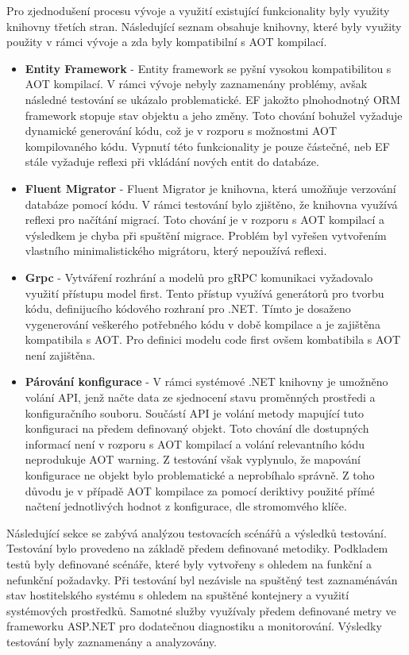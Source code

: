 
Pro zjednodušení procesu vývoje a využití existující funkcionality byly využity knihovny třetích stran. Následující seznam obsahuje knihovny, které byly využity použity v rámci vývoje a zda byly kompatibilní s AOT kompilací.

\begin{itemize}
  \item \textbf{Entity Framework} - Entity framework se pyšní vysokou kompatibilitou s AOT kompilací. V rámci vývoje nebyly zaznamenány problémy, avšak následné testování se ukázalo problematické. EF jakožto plnohodnotný ORM framework stopuje stav objektu a jeho změny. Toto chování bohužel vyžaduje dynamické generování kódu, což je v rozporu s možnostmi AOT kompilovaného kódu. Vypnutí této funkcionality je pouze částečné, neb EF stále vyžaduje reflexi při vkládání nových entit do databáze.
  \item \textbf{Fluent Migrator} - Fluent Migrator je knihovna, která umožňuje verzování databáze pomocí kódu. V rámci testování bylo zjištěno, že knihovna využívá reflexi pro načítání migrací. Toto chování je v rozporu s AOT kompilací a výsledkem je chyba při spuštění migrace. Problém byl vyřešen vytvořením vlastního minimalistického migrátoru, který nepoužívá reflexi.
  \item \textbf{Grpc} - Vytváření rozhrání a modelů pro gRPC komunikaci vyžadovalo využití přístupu model first. Tento přístup využívá generátorů pro tvorbu kódu, definijucího kódového rozhraní pro .NET. Tímto je dosaženo vygenerování veškerého potřebného kódu v době kompilace a je zajištěna kompatibila s AOT. Pro definici modelu code first ovšem kombatibila s AOT není zajištěna.
  \item \textbf{Párování konfigurace} - V rámci systémové .NET knihovny je umožněno volání API, jenž načte data ze sjednocení stavu proměnných prostředi a konfiguračního souboru. Součástí API je volání metody mapující tuto konfiguraci na předem definovaný objekt. Toto chování dle dostupných informací není v rozporu s AOT kompilací a volání relevantního kódu neprodukuje AOT warning. Z testování však vyplynulo, že mapování konfigurace ne objekt bylo problematické a neprobíhalo správně. Z toho důvodu je v případě AOT kompilace za pomocí deriktivy použité přímé načtení jednotlivých hodnot z konfigurace, dle stromomvého klíče.
\end{itemize}


Následující sekce se zabývá analýzou testovacích scénářů a výsledků testování. Testování bylo provedeno na základě předem definované metodiky. Podkladem testů byly definované scénáře, které byly vytvořeny s ohledem na funkční a nefunkční požadavky. Při testování byl nezávisle na spuštěný test zaznaménáván stav hostitelského systému s ohledem na spuštěné kontejnery a využití systémových prostředků. Samotné služby využívaly předem definované metry ve frameworku ASP.NET pro dodatečnou diagnostiku a monitorování. Výsledky testování byly zaznamenány a analyzovány.

